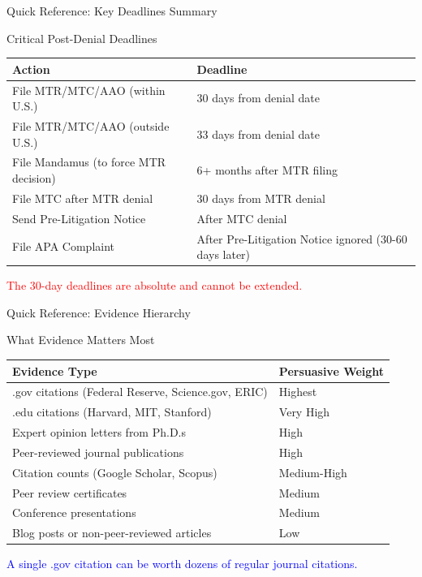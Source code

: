 \documentclass[11pt]{beamer}
\begin{document}
	
	\begin{frame}{Quick Reference: Key Deadlines Summary}
		\scriptsize
		\begin{block}{Critical Post-Denial Deadlines}
			\centering
			\begin{tabular}{|p{5cm}|p{4cm}|}
				\hline
				\textbf{Action} & \textbf{Deadline} \\
				\hline
				File MTR/MTC/AAO (within U.S.) & 30 days from denial date \\
				\hline
				File MTR/MTC/AAO (outside U.S.) & 33 days from denial date \\
				\hline
				File Mandamus (to force MTR decision) & 6+ months after MTR filing \\
				\hline
				File MTC after MTR denial & 30 days from MTR denial \\
				\hline
				Send Pre-Litigation Notice & After MTC denial \\
				\hline
				File APA Complaint & After Pre-Litigation Notice ignored (30-60 days later) \\
				\hline
			\end{tabular}
			\vspace{0.2cm}
			\textcolor{red}{The 30-day deadlines are absolute and cannot be extended.}
		\end{block}
	\end{frame}
	
	\begin{frame}{Quick Reference: Evidence Hierarchy}
		\scriptsize
		\begin{block}{What Evidence Matters Most}
			\centering
			\begin{tabular}{|p{5cm}|p{4cm}|}
				\hline
				\textbf{Evidence Type} & \textbf{Persuasive Weight} \\
				\hline
				.gov citations (Federal Reserve, Science.gov, ERIC) & Highest \\
				\hline
				.edu citations (Harvard, MIT, Stanford) & Very High \\
				\hline
				Expert opinion letters from Ph.D.s & High \\
				\hline
				Peer-reviewed journal publications & High \\
				\hline
				Citation counts (Google Scholar, Scopus) & Medium-High \\
				\hline
				Peer review certificates & Medium \\
				\hline
				Conference presentations & Medium \\
				\hline
				Blog posts or non-peer-reviewed articles & Low \\
				\hline
			\end{tabular}
			\vspace{0.2cm}
			\textcolor{blue}{A single .gov citation can be worth dozens of regular journal citations.}
		\end{block}
	\end{frame}
	
\end{document}
